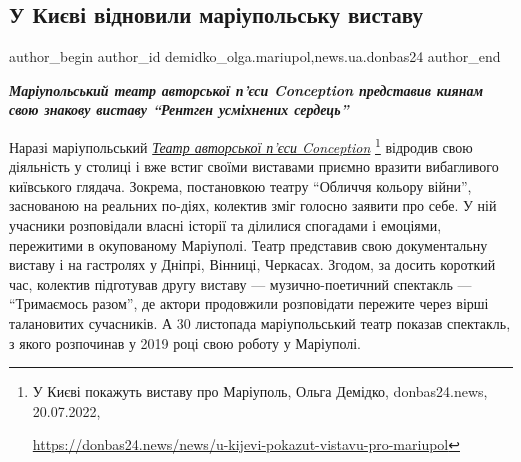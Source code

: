  
 
 
 
 
 
\subsection{У Києві відновили маріупольську виставу}
\label{sec:02_12_2022.stz.news.ua.donbas24.1.u_kyevi_vidnovyly_mariupolsku_vystavu}
 
\ifcmt
 author_begin
   author_id demidko_olga.mariupol,news.ua.donbas24
 author_end
\fi


\begin{center}
  \em\color{blue}\bfseries\Large
Маріупольський театр авторської п'єси Conception представив киянам свою знакову
виставу \enquote{Рентген усміхнених сердець} 
\end{center}

Наразі маріупольський \href{https://donbas24.news/news/u-kijevi-pokazut-vistavu-pro-mariupol}{%
\emph{Театр авторської п'єси Conception}}%
\footnote{У Києві покажуть виставу про Маріуполь, Ольга Демідко, donbas24.news, 20.07.2022, \par%
\url{https://donbas24.news/news/u-kijevi-pokazut-vistavu-pro-mariupol}%
}
відродив свою діяльність у столиці і вже встиг своїми виставами приємно вразити
вибагливого київського глядача. Зокрема, постановкою театру \enquote{Обличчя
кольору війни}, заснованою на реальних по\hyp{}діях, колектив зміг голосно заявити
про себе. У ній учасники розповідали власні історії та ділилися спогадами і
емоціями, пережитими в окупованому Маріуполі. Театр представив свою
документальну виставу і на гастролях у Дніпрі, Вінниці, Черкасах. Згодом, за
досить короткий час, колектив підготував другу виставу — музично-поетичний
спектакль — \enquote{Тримаємось разом}, де актори продовжили розповідати пережите через
вірші талановитих сучасників. А 30 листопада маріупольський театр показав
спектакль, з якого розпочинав у 2019 році свою роботу у Маріуполі.

